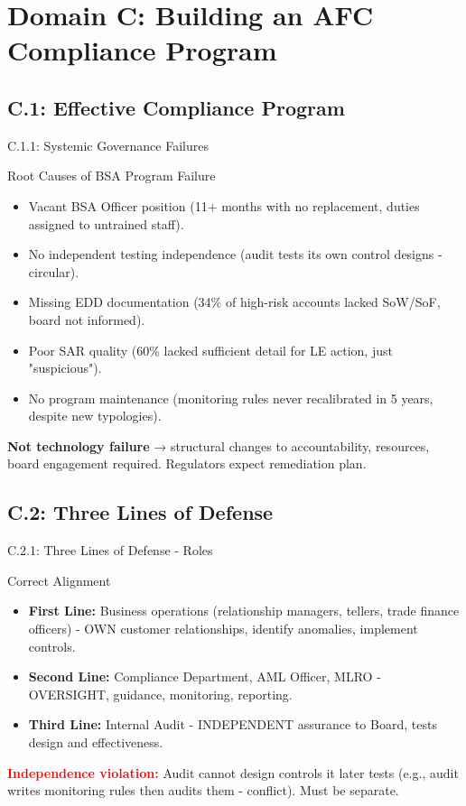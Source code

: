 \documentclass{beamer}
\begin{document}
	\section{Domain C: Building an AFC Compliance Program}
	
	\subsection{C.1: Effective Compliance Program}
	
	\begin{frame}{C.1.1: Systemic Governance Failures}
		\begin{block}{Root Causes of BSA Program Failure}
			\begin{itemize}
				\item Vacant BSA Officer position (11+ months with no replacement, duties assigned to untrained staff).
				\item No independent testing independence (audit tests its own control designs - circular).
				\item Missing EDD documentation (34\% of high-risk accounts lacked SoW/SoF, board not informed).
				\item Poor SAR quality (60\% lacked sufficient detail for LE action, just "suspicious").
				\item No program maintenance (monitoring rules never recalibrated in 5 years, despite new typologies).
			\end{itemize}
		\end{block}
		\textbf{Not technology failure} → structural changes to accountability, resources, board engagement required. Regulators expect remediation plan.
	\end{frame}
	
	\subsection{C.2: Three Lines of Defense}
	
	\begin{frame}{C.2.1: Three Lines of Defense - Roles}
		\begin{block}{Correct Alignment}
			\begin{itemize}
				\item \textbf{First Line:} Business operations (relationship managers, tellers, trade finance officers) - OWN customer relationships, identify anomalies, implement controls.
				\item \textbf{Second Line:} Compliance Department, AML Officer, MLRO - OVERSIGHT, guidance, monitoring, reporting.
				\item \textbf{Third Line:} Internal Audit - INDEPENDENT assurance to Board, tests design and effectiveness.
			\end{itemize}
		\end{block}
		\textcolor{red}{\textbf{ Independence violation:}} Audit cannot design controls it later tests (e.g., audit writes monitoring rules then audits them - conflict). Must be separate.
	\end{frame}
	
\end{document}
